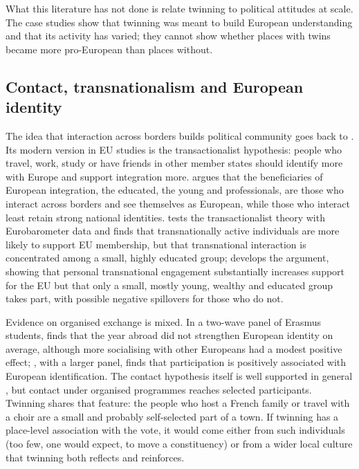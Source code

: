 \documentclass[11pt,a4paper]{article}
\begin{document}
What this literature has not done is relate twinning to political attitudes at scale. The case studies show that twinning was meant to build European understanding and that its activity has varied; they cannot show whether places with twins became more pro-European than places without.

\subsection{Contact, transnationalism and European identity}
The idea that interaction across borders builds political community goes back to \citet{deutsch1957}. Its modern version in EU studies is the transactionalist hypothesis: people who travel, work, study or have friends in other member states should identify more with Europe and support integration more. \citet{fligstein2008} argues that the beneficiaries of European integration, the educated, the young and professionals, are those who interact across borders and see themselves as European, while those who interact least retain strong national identities. \citet{kuhn2011} tests the transactionalist theory with Eurobarometer data and finds that transnationally active individuals are more likely to support EU membership, but that transnational interaction is concentrated among a small, highly educated group; \citet{kuhn2015} develops the argument, showing that personal transnational engagement substantially increases support for the EU but that only a small, mostly young, wealthy and educated group takes part, with possible negative spillovers for those who do not.

Evidence on organised exchange is mixed. In a two-wave panel of Erasmus students, \citet{sigalas2010} finds that the year abroad did not strengthen European identity on average, although more socialising with other Europeans had a modest positive effect; \citet{mitchell2015}, with a larger panel, finds that participation is positively associated with European identification. The contact hypothesis itself is well supported in general \citep{pettigrew2006}, but contact under organised programmes reaches selected participants. Twinning shares that feature: the people who host a French family or travel with a choir are a small and probably self-selected part of a town. If twinning has a place-level association with the vote, it would come either from such individuals (too few, one would expect, to move a constituency) or from a wider local culture that twinning both reflects and reinforces.
\end{document}
